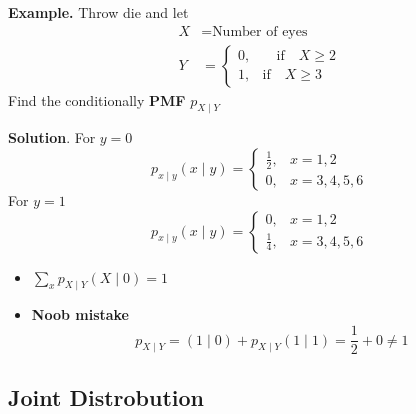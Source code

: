 \documentclass{article}
\theoremstyle{remark}
\begin{document}
\begin{tcolorbox}
  \textbf{Example.} Throw die and let \[
  \begin{split}
    X &=  \text{Number of eyes} \\
    Y &= \begin{cases}
      0,  &  \quad  \text{if} \quad  X \ge 2 \\
      1,   &  \text{if}   \quad X \ge 3
    \end{cases}  
  \end{split} 
  \] 
  Find the conditionally \textbf{PMF}  $p _{X  \mid  Y}$

  \par
  \textbf{Solution}. For $y = 0$ \[
  p_{x \mid y} \left( x  \mid y \right) = \begin{cases}
    \frac{1}{2} ,  &  x = 1,2 \\
    0, & x = 3,4,5,6  
  \end{cases} 
  \] 
  For $y = 1$ \[
  p_{x  \mid  y} \left( x  \mid  y \right) = \begin{cases}
    0,  &  x= 1,2 \\
    \frac{1}{4} ,  &  x=3,4,5,6
  \end{cases}
  \] 

\end{tcolorbox}

  \begin{tcolorbox}
    \begin{itemize}
      \item $\sum_{x}^{}  p_{X \mid Y} \left( X  \mid 0 \right) = 1$
      \item \textbf{Noob mistake}  \[
          p_{X \mid Y} = \left( 1  \mid 0 \right) + p_{X \mid Y } \left( 1 \mid 1 \right) = \frac{1}{2} + 0 \neq 1
      \] 
    \end{itemize}
  \end{tcolorbox}


  \subsection{Joint Distrobution}%
  \label{sub:joint_distrobution}
  
\end{document}
